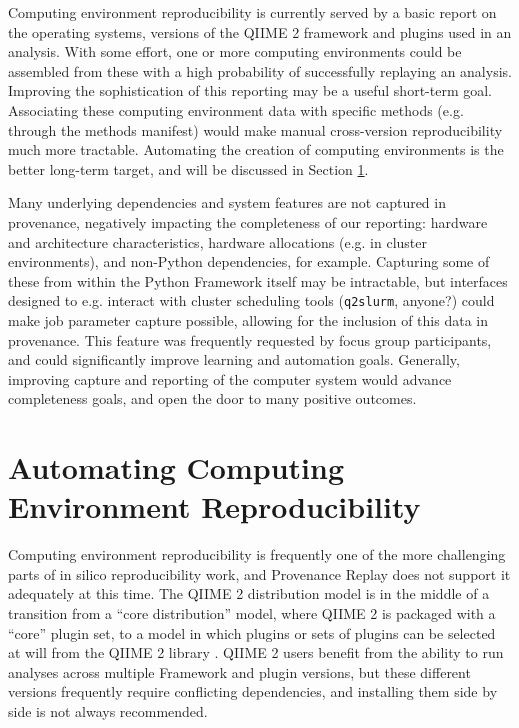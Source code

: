 Computing environment reproducibility is currently served by a basic report  on
the operating systems, versions of the QIIME 2 framework and plugins used in an
analysis. With some effort, one or more computing environments could be
assembled from these with a high probability of successfully replaying an
analysis. Improving the sophistication of this reporting may be a useful
short-term goal. Associating these computing environment data with specific
methods (e.g. through the methods manifest) would make manual cross-version
reproducibility much more tractable. Automating the creation of computing
environments is the better long-term target, and will be discussed in Section
\ref{automating_comp_env_repr}.

Many underlying dependencies and system features are not captured in provenance,
negatively impacting the completeness of our reporting: hardware and
architecture characteristics, hardware allocations (e.g. in cluster
environments), and non-Python dependencies, for example. Capturing some of these
from within the Python Framework itself may be intractable, but interfaces
designed to e.g. interact with cluster scheduling tools (\texttt{q2slurm},
anyone?) could make job parameter capture possible, allowing for the inclusion
of this data in provenance. This feature was frequently requested by focus group
participants, and could significantly improve learning and automation goals.
Generally, improving capture and reporting of the computer system would advance
completeness goals, and open the door to many positive outcomes.


\section{Automating Computing Environment Reproducibility \parencite[Issue 78]{keefe_issues_2021}}
\label{automating_comp_env_repr}

Computing environment reproducibility is frequently one of the more challenging
parts of in silico reproducibility work, and Provenance Replay does not support
it adequately at this time. The QIIME 2 distribution model is in the middle of a
transition from a “core distribution” model, where QIIME 2 is packaged with a
“core” plugin set, to a model in which plugins or sets of plugins can be
selected at will from the QIIME 2 library \parencite{qiime_2_development_team_about_2018}.
QIIME 2 users benefit from the ability to run analyses across multiple Framework
and plugin versions, but these different versions frequently require conflicting
dependencies, and installing them side by side is not always recommended.

